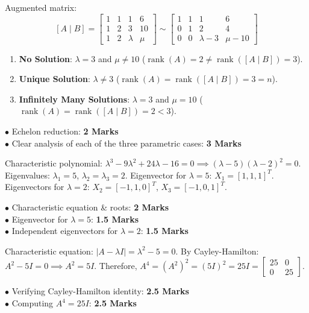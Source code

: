 \begin{solutionbox}
Augmented matrix:
\[
[A \mid B] = \begin{bmatrix} 1 & 1 & 1 & 6 \\ 1 & 2 & 3 & 10 \\ 1 & 2 & \lambda & \mu \end{bmatrix} \sim \begin{bmatrix} 1 & 1 & 1 & 6 \\ 0 & 1 & 2 & 4 \\ 0 & 0 & \lambda - 3 & \mu - 10 \end{bmatrix}
\]
\begin{enumerate}
    \item \textbf{No Solution}: $\lambda = 3$ and $\mu \neq 10$ ($\operatorname{rank}(A) = 2 \neq \operatorname{rank}([A\mid B]) = 3$).
    \item \textbf{Unique Solution}: $\lambda \neq 3$ ($\operatorname{rank}(A) = \operatorname{rank}([A\mid B]) = 3 = n$).
    \item \textbf{Infinitely Many Solutions}: $\lambda = 3$ and $\mu = 10$ ($\operatorname{rank}(A) = \operatorname{rank}([A\mid B]) = 2 < 3$).
\end{enumerate}
\begin{markingrubric}
$\bullet$ Echelon reduction: \textbf{2 Marks}\\
$\bullet$ Clear analysis of each of the three parametric cases: \textbf{3 Marks}
\end{markingrubric}
\end{solutionbox}

\begin{solutionbox}
Characteristic polynomial: $\lambda^3 - 9\lambda^2 + 24\lambda - 16 = 0 \implies (\lambda - 5)(\lambda - 2)^2 = 0$.
Eigenvalues: $\lambda_1 = 5$, $\lambda_2 = \lambda_3 = 2$.
Eigenvector for $\lambda = 5$: $X_1 = [1, 1, 1]^T$.
Eigenvectors for $\lambda = 2$: $X_2 = [-1, 1, 0]^T$, $X_3 = [-1, 0, 1]^T$.
\begin{markingrubric}
$\bullet$ Characteristic equation \& roots: \textbf{2 Marks}\\
$\bullet$ Eigenvector for $\lambda = 5$: \textbf{1.5 Marks}\\
$\bullet$ Independent eigenvectors for $\lambda = 2$: \textbf{1.5 Marks}
\end{markingrubric}
\end{solutionbox}

\begin{solutionbox}
Characteristic equation: $|A - \lambda I| = \lambda^2 - 5 = 0$.
By Cayley-Hamilton: $A^2 - 5I = 0 \implies A^2 = 5I$.
Therefore, $A^4 = (A^2)^2 = (5I)^2 = 25I = \begin{bmatrix} 25 & 0 \\ 0 & 25 \end{bmatrix}$.
\begin{markingrubric}
$\bullet$ Verifying Cayley-Hamilton identity: \textbf{2.5 Marks}\\
$\bullet$ Computing $A^4 = 25I$: \textbf{2.5 Marks}
\end{markingrubric}
\end{solutionbox}

